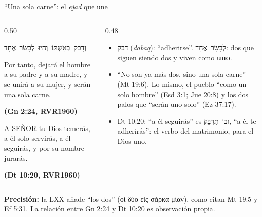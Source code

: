 \documentclass[hyperref={bookmarks=false},aspectratio=169]{beamer}
\newcommand{\heb}[1]{\mbox{\foreignlanguage{hebrew}{#1}}}
\newcommand{\grc}[1]{\foreignlanguage{ancientgreek}{#1}}
\newcommand{\SENOR}{S{\fontsize{0.78em}{1em}\selectfont EÑOR}}
\newcommand{\fuente}[1]{\par\hfill{\upshape\bfseries\footnotesize\textcolor{azul}{#1}}}
\newcommand{\destacar}[1]{\textbf{\textcolor{azul}{#1}}}
\newcommand{\precision}[1]{{\footnotesize\color{gris}\textbf{Precisión:} #1}}
\begin{document}
\begin{frame}{``Una sola carne'': el \emph{ejad} que une}
\begin{columns}[t,onlytextwidth]
\begin{column}{0.50\textwidth}
\begin{center}\small\heb{וְדָבַק בְּאִשְׁתּוֹ וְהָיוּ לְבָשָׂר אֶחָד}\end{center}
\begin{cita}[fontupper=\scriptsize\itshape]Por tanto, dejará el hombre a su padre y a su madre, y se unirá a su mujer, y serán una sola carne.\fuente{(Gn 2:24, RVR1960)}\end{cita}
\begin{cita}[fontupper=\scriptsize\itshape]A \SENOR{} tu Dios temerás, a él solo servirás, a él seguirás, y por su nombre jurarás.\fuente{(Dt 10:20, RVR1960)}\end{cita}
\end{column}
\begin{column}{0.48\textwidth}\small
\begin{itemize}
\item \heb{דבק} (\emph{dabaq}): ``adherirse''. \heb{לְבָשָׂר אֶחָד}: dos que siguen siendo dos y viven como \destacar{uno}.
\item ``No son ya más dos, sino una sola carne'' (Mt 19:6). Lo mismo, el pueblo ``como un solo hombre'' (Esd 3:1; Jue 20:8) y los dos palos que ``serán uno solo'' (Ez 37:17).
\item Dt 10:20: ``a él seguirás'' es \heb{וּבוֹ תִדְבָּק}, ``a él te adherirás'': el verbo del matrimonio, para el Dios uno.
\end{itemize}
\end{column}
\end{columns}\par\smallskip
\precision{la LXX añade ``los dos'' (\grc{οἱ δύο εἰς σάρκα μίαν}), como citan Mt 19:5 y Ef 5:31. La relación entre Gn 2:24 y Dt 10:20 es observación propia.}
\end{frame}
\end{document}
